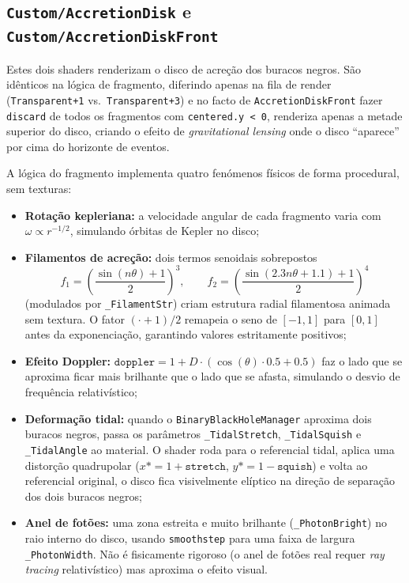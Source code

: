 \documentclass[12pt,a4paper]{article}
\begin{document}
\subsection{\texttt{Custom/AccretionDisk} e \texttt{Custom/AccretionDiskFront}}

Estes dois shaders renderizam o disco de acre\c{c}\~{a}o dos buracos negros. S\~{a}o id\^{e}nticos na l\'{o}gica de fragmento, diferindo apenas na fila de render (\texttt{Transparent+1} vs.\ \texttt{Transparent+3}) e no facto de \texttt{AccretionDiskFront} fazer \texttt{discard} de todos os fragmentos com \texttt{centered.y < 0}, renderiza apenas a metade superior do disco, criando o efeito de \textit{gravitational lensing} onde o disco ``aparece'' por cima do horizonte de eventos.

A l\'{o}gica do fragmento implementa quatro fen\'{o}menos f\'{i}sicos de forma procedural, sem texturas:

\begin{itemize}
  \item \textbf{Rota\c{c}\~{a}o kepleriana:} a velocidade angular de cada fragmento varia com $\omega \propto r^{-1/2}$, simulando \'{o}rbitas de Kepler no disco;

  \item \textbf{Filamentos de acre\c{c}\~{a}o:} dois termos senoidais sobrepostos
  \[
    f_1 = \left(\frac{\sin(n\theta)+1}{2}\right)^{\!3},\qquad
    f_2 = \left(\frac{\sin(2.3n\theta + 1.1)+1}{2}\right)^{\!4}
  \]
  (modulados por \texttt{\_FilamentStr}) criam estrutura radial filamentosa animada sem textura. O fator $(\cdot+1)/2$ remapeia o seno de $[-1,1]$ para $[0,1]$ antes da exponencia\c{c}\~{a}o, garantindo valores estritamente positivos;
  
  \item \textbf{Efeito Doppler:} $\texttt{doppler} = 1 + D \cdot (\cos(\theta) \cdot 0.5 + 0.5)$ faz o lado que se aproxima ficar mais brilhante que o lado que se afasta, simulando o desvio de frequ\^{e}ncia relativ\'{i}stico;
  
  \item \textbf{Deforma\c{c}\~{a}o tidal:} quando o \texttt{BinaryBlackHoleManager} aproxima dois buracos negros, passa os par\^{a}metros \texttt{\_TidalStretch}, \texttt{\_TidalSquish} e \texttt{\_TidalAngle} ao material. O shader roda para o referencial tidal, aplica uma distor\c{c}\~{a}o quadrupolar ($x \mathbin{*}= 1 + \texttt{stretch}$, $y \mathbin{*}= 1 - \texttt{squish}$) e volta ao referencial original, o disco fica visivelmente el\'{i}ptico na dire\c{c}\~{a}o de sep\-ara\c{c}\~{a}o dos dois buracos negros;
  
  \item \textbf{Anel de fot\~{o}es:} uma zona estreita e muito brilhante (\texttt{\_PhotonBright}) no raio interno do disco, usando \texttt{smoothstep} para uma faixa de largura \texttt{\_PhotonWidth}. N\~{a}o \'{e} fisicamente rigoroso (o anel de fot\~{o}es real requer \textit{ray tracing} relativ\'{i}stico) mas aproxima o efeito visual.
\end{itemize}
\end{document}
